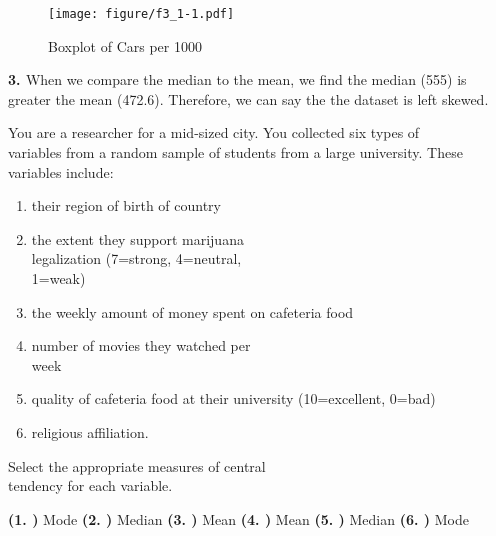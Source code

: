 \documentclass[11pt, chapterprefix=true]{scrbook}\usepackage[]{graphicx}\usepackage[]{color}
\begin{document}
\begin{exercises}
\begin{solution}
\begin{figure}[htbp] %
   \centering
   \texttt{[image: figure/f3\_1-1.pdf]}
   \caption{Boxplot of Cars per 1000}
   \label{fig:f3_1}
\end{figure}

{\bf{3. }} When we compare the median to the mean, we find the median (555) is greater the mean (472.6).  Therefore, we can say the the dataset is left skewed.

  \end{solution}

  \begin{exercise} %

You are a researcher for a mid-sized city. You collected six types of \\ variables from a random sample of students from a large university.  These variables include:

  \begin{enumerate}
  \item their region of birth of country
  \item the extent they support marijuana \\ legalization (7=strong, 4=neutral, \\ 1=weak)
  \item the weekly amount of money spent on cafeteria food
  \item number of movies they watched per \\ week
  \item quality of cafeteria food at their university (10=excellent, 0=bad)
  \item religious affiliation.
  \end{enumerate}

Select the  appropriate measures of central \\ tendency for each variable.

 


  \end{exercise}
  \begin{solution}   %

  {\bf{(1. )}} Mode  {\bf{(2. )}} Median  {\bf{(3. )}} Mean  {\bf{(4. )}} Mean  {\bf{(5. )}} Median  {\bf{(6. )}} Mode

  \end{solution}


\end{exercises}
\end{document}
